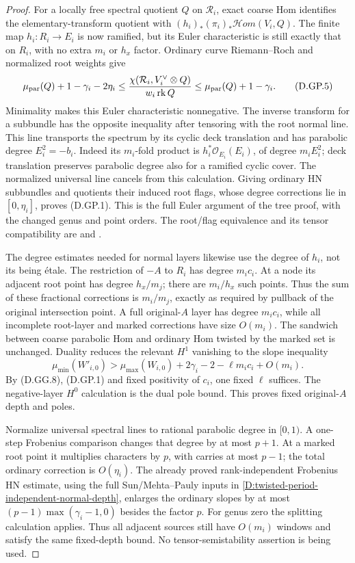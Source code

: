 \begin{proof}
For a locally free spectral quotient \(Q\) on
\(\mathcal R_i\), exact coarse Hom identifies the
elementary-transform quotient with
\((h_i)_*(\pi_i)_*\mathcal Hom(V_i,Q)\).
The finite map \(h_i:R_i\to E_i\) is now ramified,
but its Euler characteristic is still exactly that
on \(R_i\), with no extra \(m_i\) or \(h_x\) factor.
Ordinary curve Riemann--Roch and normalized root
weights give
\[
 \mu_{\rm par}(Q)+1-\gamma_i-2\eta_i
 \leq
 \frac{\chi(\mathcal R_i,V_i^\vee\otimes Q)}
             {w_i\operatorname{rk}Q}
 \leq\mu_{\rm par}(Q)+1-\gamma_i.                      \tag{D.GP.5}
\]
Minimality makes this Euler characteristic nonnegative.
The inverse transform for a subbundle has the opposite
inequality after tensoring with the root normal line.
This line transports the spectrum by its cyclic deck
translation and has parabolic degree \(E_i^2=-b_i\).
Indeed its \(m_i\)-fold product is
\(h_i^*\mathcal O_{E_i}(E_i)\), of degree \(m_iE_i^2\);
deck translation preserves parabolic degree also for
a ramified cyclic cover. The normalized universal
line cancels from this calculation. Giving ordinary
HN subbundles and quotients their induced root flags,
whose degree corrections lie in \([0,\eta_i]\), proves
(D.GP.1). This is the full Euler argument of the
tree proof, with the changed genus and point orders.
The root/flag equivalence and its tensor compatibility
are \citet[Proposition3 and Theorem4]{Borne2007D}
and \citet[Theorem6.1]{BorneVistoli2012D}.

The degree estimates needed for normal layers likewise
use the degree of \(h_i\), not its being étale.
The restriction of \(-A\) to \(R_i\) has degree
\(m_i c_i\). At a node its adjacent root point has
degree \(h_x/m_j\); there are \(m_i/h_x\) such points.
Thus the sum of these fractional corrections is
\(m_i/m_j\), exactly as required by pullback of the
original intersection point. A full original-\(A\)
layer has degree \(m_i c_i\), while all incomplete
root-layer and marked corrections have size \(O(m_i)\).
The sandwich between coarse parabolic Hom and
ordinary Hom twisted by the marked set is unchanged.
Duality reduces the relevant \(H^1\) vanishing to
the slope inequality
\[
 \mu_{\min}(W'_{i,0})>
 \mu_{\max}(W_{i,0})+2\gamma_i-2-\ell m_i c_i
                       +O(m_i).                       \tag{D.GP.6}
\]
By (D.GG.8), (D.GP.1) and fixed positivity of \(c_i\),
one fixed \(\ell\) suffices. The negative-layer
\(H^0\) calculation is the dual pole bound. This
proves fixed original-\(A\) depth and poles.

Normalize universal spectral lines to rational
parabolic degree in \([0,1)\). A one-step Frobenius
comparison changes that degree by at most \(p+1\).
At a marked root point it multiplies characters by
\(p\), with carries at most \(p-1\); the total
ordinary correction is \(O(\eta_i)\).
The already proved rank-independent Frobenius HN
estimate, using the full Sun/Mehta--Pauly inputs in
\ref{D:twisted-period-independent-normal-depth}, enlarges the
ordinary slopes by at most
\((p-1)\max(\gamma_i-1,0)\) besides the factor \(p\).
For genus zero the splitting calculation applies.
Thus all adjacent sources still have \(O(m_i)\)
windows and satisfy the same fixed-depth bound.
No tensor-semistability assertion is being used.


\end{proof}
